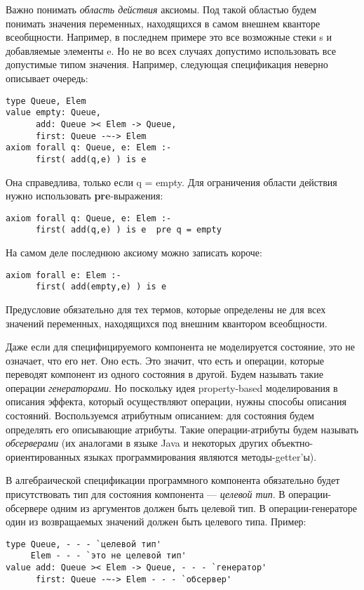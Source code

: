Важно понимать \emph{область действия} аксиомы. Под такой областью будем понимать значения переменных, находящихся в самом внешнем кванторе всеобщности. Например, в последнем примере это все возможные стеки s и добавляемые элементы e. Но не во всех случаях допустимо использовать все допустимые типом значения. Например, следующая спецификация неверно описывает очередь:
\begin{lstlisting}
type Queue, Elem
value empty: Queue,
      add: Queue >< Elem -> Queue,
      first: Queue -~-> Elem
axiom forall q: Queue, e: Elem :-
      first( add(q,e) ) is e
\end{lstlisting}

Она справедлива, только если q = empty. Для ограничения области действия нужно использовать \textbf{pre}-выражения:
\begin{lstlisting}
axiom forall q: Queue, e: Elem :-
      first( add(q,e) ) is e  pre q = empty
\end{lstlisting}

На самом деле последнюю аксиому можно записать короче:
\begin{lstlisting}
axiom forall e: Elem :-
      first( add(empty,e) ) is e
\end{lstlisting}

Предусловие обязательно для тех термов, которые определены не для всех значений переменных, находящихся под внешним квантором всеобщности.


Даже если для специфицируемого компонента не моделируется состояние, это не означает, что его нет. Оно есть. Это значит, что есть и операции, которые переводят компонент из одного состояния в другой. Будем называть такие операции \emph{генераторами}. Но поскольку идея property-based моделирования в описания эффекта, который осуществляют операции, нужны способы описания состояний. Воспользуемся атрибутным описанием: для состояния будем определять его описывающие атрибуты. Такие операции-атрибуты будем называть \emph{обсерверами} (их аналогами в языке Java и некоторых других объектно-ориентированных языках программирования являются методы-getter'ы).

В алгебраической спецификации программного компонента обязательно будет присутствовать тип для состояния компонента --- \emph{целевой тип}. В операции-обсервере одним из аргументов должен быть целевой тип. В операции-генераторе один из возвращаемых значений должен быть целевого типа. Пример:
\begin{lstlisting}[escapeinside=`']
type Queue, - - - `целевой тип'
     Elem - - - `это не целевой тип'
value add: Queue >< Elem -> Queue, - - - `генератор'
      first: Queue -~-> Elem - - - `обсервер'
\end{lstlisting}


